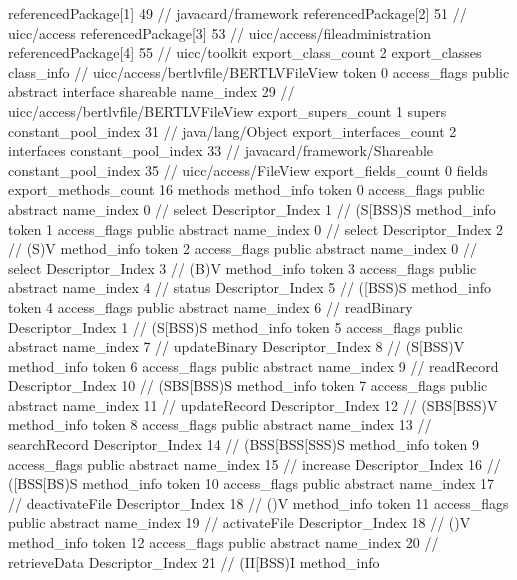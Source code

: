 {	referencedPackage[1]	49		// javacard/framework
	referencedPackage[2]	51		// uicc/access
	referencedPackage[3]	53		// uicc/access/fileadministration
	referencedPackage[4]	55		// uicc/toolkit
	export_class_count	2
	export_classes {
		class_info {		// uicc/access/bertlvfile/BERTLVFileView
			token	0
			access_flags	public abstract interface shareable
			name_index	29		// uicc/access/bertlvfile/BERTLVFileView
			export_supers_count	1
			supers {
				constant_pool_index	31		// java/lang/Object
			}
			export_interfaces_count	2
			interfaces {
				constant_pool_index	33		// javacard/framework/Shareable
				constant_pool_index	35		// uicc/access/FileView
			}
			export_fields_count	0
			fields {
			}
			export_methods_count	16
			methods {
				method_info {
					token	0
					access_flags	public abstract
					name_index	0		// select
					Descriptor_Index	1		// (S[BSS)S
				}
				method_info {
					token	1
					access_flags	public abstract
					name_index	0		// select
					Descriptor_Index	2		// (S)V
				}
				method_info {
					token	2
					access_flags	public abstract
					name_index	0		// select
					Descriptor_Index	3		// (B)V
				}
				method_info {
					token	3
					access_flags	public abstract
					name_index	4		// status
					Descriptor_Index	5		// ([BSS)S
				}
				method_info {
					token	4
					access_flags	public abstract
					name_index	6		// readBinary
					Descriptor_Index	1		// (S[BSS)S
				}
				method_info {
					token	5
					access_flags	public abstract
					name_index	7		// updateBinary
					Descriptor_Index	8		// (S[BSS)V
				}
				method_info {
					token	6
					access_flags	public abstract
					name_index	9		// readRecord
					Descriptor_Index	10		// (SBS[BSS)S
				}
				method_info {
					token	7
					access_flags	public abstract
					name_index	11		// updateRecord
					Descriptor_Index	12		// (SBS[BSS)V
				}
				method_info {
					token	8
					access_flags	public abstract
					name_index	13		// searchRecord
					Descriptor_Index	14		// (BSS[BSS[SSS)S
				}
				method_info {
					token	9
					access_flags	public abstract
					name_index	15		// increase
					Descriptor_Index	16		// ([BSS[BS)S
				}
				method_info {
					token	10
					access_flags	public abstract
					name_index	17		// deactivateFile
					Descriptor_Index	18		// ()V
				}
				method_info {
					token	11
					access_flags	public abstract
					name_index	19		// activateFile
					Descriptor_Index	18		// ()V
				}
				method_info {
					token	12
					access_flags	public abstract
					name_index	20		// retrieveData
					Descriptor_Index	21		// (II[BSS)I
				}
				method_info {
}}}}}
